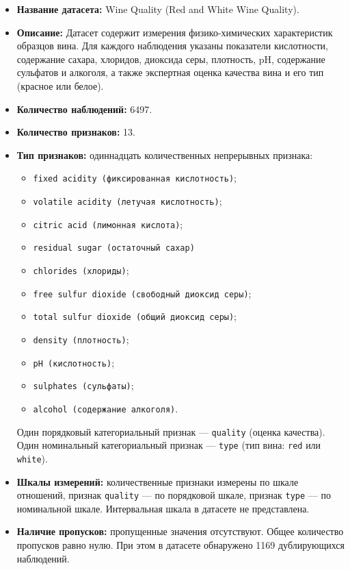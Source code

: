 \begin{itemize}
    \item \textbf{Название датасета:} Wine Quality (Red and White Wine Quality).

    \item \textbf{Описание:} Датасет содержит измерения физико-химических характеристик образцов вина. Для каждого наблюдения указаны показатели кислотности, содержание сахара, хлоридов, диоксида серы, плотность, pH, содержание сульфатов и алкоголя, а также экспертная оценка качества вина и его тип (красное или белое).

    \item \textbf{Количество наблюдений:} 6497.

    \item \textbf{Количество признаков:} 13.

    \item \textbf{Тип признаков:} одиннадцать количественных непрерывных
    признака:
    \begin{itemize}
        \item \texttt{fixed acidity (фиксированная кислотность)};
        \item \texttt{volatile acidity (летучая кислотность)};
        \item \texttt{citric acid (лимонная кислота)};
        \item \texttt{residual sugar (остаточный сахар)}
        \item \texttt{chlorides (хлориды)};
        \item \texttt{free sulfur dioxide (свободный диоксид серы)};
        \item \texttt{total sulfur dioxide (общий диоксид серы)};
        \item \texttt{density (плотность)};
        \item \texttt{pH (кислотность)};
        \item \texttt{sulphates (сульфаты)};
        \item \texttt{alcohol (содержание алкоголя)}.
    \end{itemize}
    Один порядковый категориальный признак ---
    \texttt{quality} (оценка качества). Один номинальный категориальный признак --- \texttt{type} (тип вина: \texttt{red} или \texttt{white}).

    \item \textbf{Шкалы измерений:} количественные признаки измерены по шкале отношений, признак \texttt{quality} --- по порядковой шкале, признак \texttt{type} --- по номинальной шкале. Интервальная шкала в датасете не представлена.

    \item \textbf{Наличие пропусков:} пропущенные значения отсутствуют. Общее количество пропусков равно нулю. При этом в датасете обнаружено 1169 дублирующихся наблюдений.
\end{itemize}

